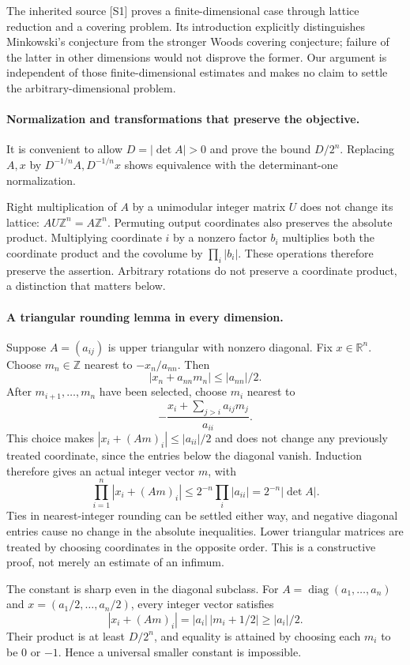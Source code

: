 \documentclass[11pt]{article}
\begin{document}
The inherited source [S1] proves a finite-dimensional case through lattice reduction and a covering problem. Its introduction explicitly distinguishes Minkowski's conjecture from the stronger Woods covering conjecture; failure of the latter in other dimensions would not disprove the former. Our argument is independent of those finite-dimensional estimates and makes no claim to settle the arbitrary-dimensional problem.

\paragraph{Normalization and transformations that preserve the objective.}
It is convenient to allow $D=|\det A|>0$ and prove the bound $D/2^n$. Replacing $A,x$ by $D^{-1/n}A,D^{-1/n}x$ shows equivalence with the determinant-one normalization.

Right multiplication of $A$ by a unimodular integer matrix $U$ does not change its lattice: $AU\mathbb Z^n=A\mathbb Z^n$. Permuting output coordinates also preserves the absolute product. Multiplying coordinate $i$ by a nonzero factor $b_i$ multiplies both the coordinate product and the covolume by $\prod_i|b_i|$. These operations therefore preserve the assertion. Arbitrary rotations do not preserve a coordinate product, a distinction that matters below.

\paragraph{A triangular rounding lemma in every dimension.}
Suppose $A=(a_{ij})$ is upper triangular with nonzero diagonal. Fix $x\in\mathbb R^n$. Choose $m_n\in\mathbb Z$ nearest to $-x_n/a_{nn}$. Then
\[
 |x_n+a_{nn}m_n|\le |a_{nn}|/2.
\]
After $m_{i+1},\ldots,m_n$ have been selected, choose $m_i$ nearest to
\[
 -\frac{x_i+\sum_{j>i}a_{ij}m_j}{a_{ii}}.
\]
This choice makes $|x_i+(Am)_i|\le|a_{ii}|/2$ and does not change any previously treated coordinate, since the entries below the diagonal vanish. Induction therefore gives an actual integer vector $m$, with
\[
 \prod_{i=1}^n|x_i+(Am)_i|
 \le2^{-n}\prod_i|a_{ii}|=2^{-n}|\det A|.
 \tag{429.1}
\]
Ties in nearest-integer rounding can be settled either way, and negative diagonal entries cause no change in the absolute inequalities. Lower triangular matrices are treated by choosing coordinates in the opposite order. This is a constructive proof, not merely an estimate of an infimum.

The constant is sharp even in the diagonal subclass. For $A=\operatorname{diag}(a_1,\ldots,a_n)$ and $x=(a_1/2,\ldots,a_n/2)$, every integer vector satisfies
\[
 |x_i+(Am)_i|=|a_i|\,|m_i+1/2|\ge|a_i|/2.
\]
Their product is at least $D/2^n$, and equality is attained by choosing each $m_i$ to be $0$ or $-1$. Hence a universal smaller constant is impossible.
\end{document}

